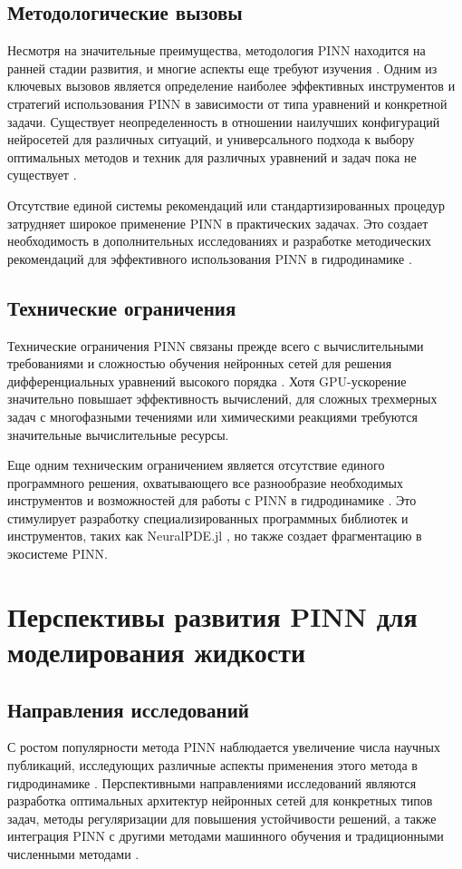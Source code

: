 \subsection{Методологические вызовы}
Несмотря на значительные преимущества, методология PINN находится на ранней стадии развития, и многие аспекты еще требуют
изучения \cite{cuomo2022scientific}. Одним из ключевых вызовов является определение наиболее эффективных инструментов
и стратегий использования PINN в зависимости от типа уравнений и конкретной задачи. Существует неопределенность в отношении
наилучших конфигураций нейросетей для различных ситуаций, и универсального подхода к выбору оптимальных методов и техник
для различных уравнений и задач пока не существует \cite{krishnapriyan2021characterizing}.

Отсутствие единой системы рекомендаций или стандартизированных процедур затрудняет широкое применение PINN в практических
задачах. Это создает необходимость в дополнительных исследованиях и разработке методических рекомендаций для эффективного
использования PINN в гидродинамике \cite{wang2022respecting}.

\subsection{Технические ограничения}
Технические ограничения PINN связаны прежде всего с вычислительными требованиями и сложностью обучения нейронных сетей для
решения дифференциальных уравнений высокого порядка \cite{wang2021understanding}. Хотя GPU-ускорение значительно повышает
эффективность вычислений, для сложных трехмерных задач с многофазными течениями или химическими реакциями требуются
значительные вычислительные ресурсы.

Еще одним техническим ограничением является отсутствие единого программного решения, охватывающего все разнообразие
необходимых инструментов и возможностей для работы с PINN в гидродинамике \cite{cuomo2022scientific}. Это стимулирует
разработку специализированных программных библиотек и инструментов, таких как NeuralPDE.jl \cite{neuralpde2023}, но также
создает фрагментацию в экосистеме PINN.

\section{Перспективы развития PINN для моделирования жидкости}
\subsection{Направления исследований}
С ростом популярности метода PINN наблюдается увеличение числа научных публикаций, исследующих различные аспекты применения
этого метода в гидродинамике \cite{karniadakis2021physics}. Перспективными направлениями исследований являются разработка
оптимальных архитектур нейронных сетей для конкретных типов задач, методы регуляризации для повышения устойчивости решений,
а также интеграция PINN с другими методами машинного обучения и традиционными численными методами \cite{jagtap2022physics}.

